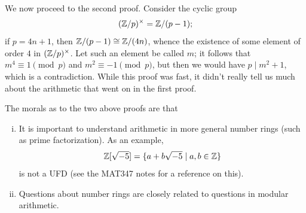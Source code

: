 We now proceed to the second proof. Consider the cyclic group
\[ (\mathbb Z/p)^\times = \mathbb Z/(p-1); \]
if $p = 4n + 1$, then $\mathbb Z/(p-1) \cong \mathbb Z/(4n)$, whence the existence of some element of order $4$ in $(\mathbb Z/p)^\times$. Let such an element be called $m$; it follows that $m^4 \equiv 1 \pmod{p}$ and $m^2 \equiv -1 \pmod{p}$, but then we would have $p \mid m^2 + 1$, which is a contradiction. While this proof was fast, it didn't really tell us much about the arithmetic that went on in the first proof.

The morals as to the two above proofs are that
\begin{enumerate}[(i)]
    \item It is important to understand arithmetic in more general number rings (such as prime factorization). As an example,
    \[ \mathbb Z[\sqrt{-5}] = \{a + b \sqrt{-5} \mid a, b \in \mathbb Z\} \]
    is not a UFD (see the MAT347 notes for a reference on this).
    \item Questions about number rings are closely related to questions in modular arithmetic.
\end{enumerate}
